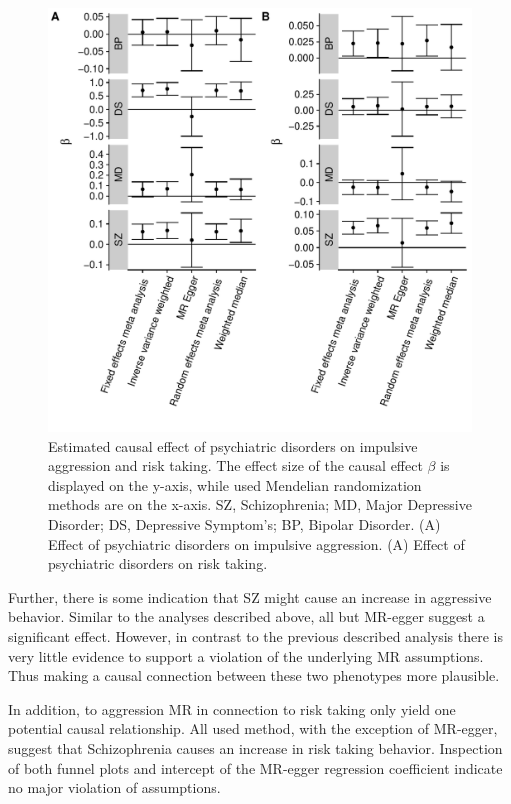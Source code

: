 \begin{figure}[htpb]
  \centering
  \includegraphics[width=0.9\linewidth]{figures/overall_mr_effect.pdf}
  \caption{Estimated causal effect of psychiatric disorders on impulsive aggression and risk taking.
    The effect size of the causal effect $\beta$ is displayed on the y-axis, while used Mendelian randomization methods are on the x-axis.
    SZ, Schizophrenia; MD, Major Depressive Disorder; DS, Depressive Symptom's; BP, Bipolar Disorder.
    (A) Effect of psychiatric disorders on impulsive aggression.
    (A) Effect of psychiatric disorders on risk taking.
  }\label{fig:overall_mr_effect}
\end{figure}

Further, there is some indication that SZ might cause an increase in aggressive behavior.
Similar to the analyses described above, all but MR-egger suggest a significant effect. 
However, in contrast to the previous described analysis there is very little evidence to support a violation of the underlying MR assumptions.
Thus making a causal connection between these two phenotypes more plausible.

In addition, to aggression MR in connection to risk taking only yield one potential causal relationship.
All used method, with the exception of MR-egger, suggest that Schizophrenia causes an increase in risk taking behavior.
Inspection of both funnel plots and intercept of the MR-egger regression coefficient indicate no major violation of assumptions.


